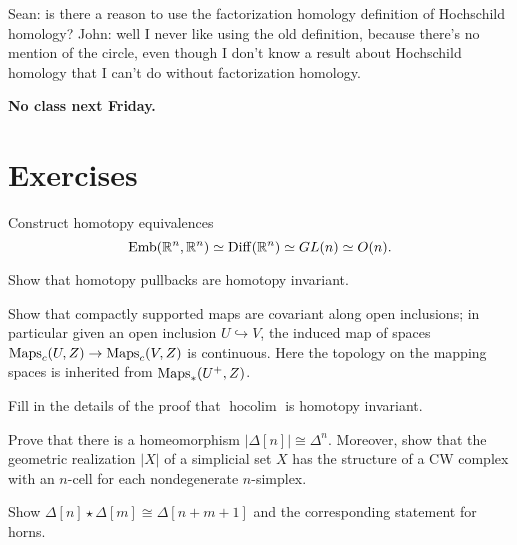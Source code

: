 \documentclass{amsart}
\DeclareMathOperator{\Emb}{Emb}
\DeclareMathOperator{\hocolim}{hocolim}
\begin{document}
Sean: is there a reason to use the factorization homology definition of Hochschild homology?
John: well I never like using the old definition, because there's no mention of the circle, even
though I don't know a result about Hochschild homology that I can't do without factorization
homology.

\textbf{No class next Friday.}




\newpage


\appendix

\section{Exercises}

\begin{exercise}
    Construct homotopy equivalences
    \begin{equation*}
        \Emb(\R^n,\R^n) \simeq \Diff(\R^n) \simeq GL(n) \simeq O(n).
    \end{equation*}
\end{exercise}

\begin{exercise}
    Show that homotopy pullbacks are homotopy invariant.
\end{exercise}

\begin{exercise}
    Show that compactly supported maps are covariant along open inclusions; in particular given an
    open inclusion $U\hookrightarrow V$, the induced map of spaces
    $\operatorname{Maps}_c(U,Z)\to \operatorname{Maps}_c(V,Z)$ is continuous. Here the topology on the mapping spaces is
    inherited from $\operatorname{Maps}_*(U^+,Z)$.
\end{exercise}

\begin{exercise}
    Fill in the details of the proof that $\hocolim$ is homotopy invariant.
\end{exercise}

\begin{exercise}
    Prove that there is a homeomorphism $|\Delta[n]|\cong \Delta^n$. Moreover, show that
    the geometric realization $|X|$ of a simplicial set $X$ has the structure of a CW
    complex with an $n$-cell for each nondegenerate $n$-simplex.
\end{exercise}

\begin{exercise}
    Show $\Delta[n]\star \Delta[m]\cong \Delta[n+m+1]$ and the corresponding statement
    for horns.
\end{exercise}
\end{document}
